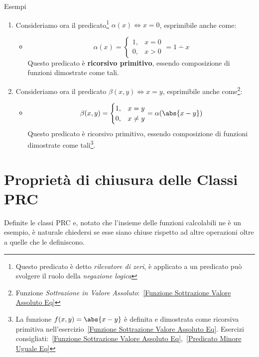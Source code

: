 \begin{generalbox}[colframe=azure-gradient-3!90!black]{Esempi}
\begin{enumerate}
\begin{itemize}
    \end{itemize}
    \item Consideriamo ora il predicato\footnote{Questo predicato è detto \textit{rilevatore di zeri}, è applicato a un predicato può svolgere il ruolo della \textit{negazione logica}} \(\alpha(x)\iff x=0\), esprimibile anche come:
    \begin{itemize}
     \item []
     \begin{equation}
        \alpha(x)=\begin{cases}
                    1, & x=0\\
                    0, & x>0
                  \end{cases} = 1\dotminus x
      \end{equation}
      Questo predicato è \textbf{ricorsivo primitivo}, essendo composizione di funzioni dimostrate come tali.
    \end{itemize}
    \item Consideriamo ora il predicato \(\beta(x,y)\iff x=y\), esprimibile anche come\footnote{Funzione \textit{Sottrazione in Valore Assoluto}:~\ref{Funzione Sottrazione Valore Assoluto Eq}}:
    \begin{itemize}
     \item []
     \begin{equation}
        \beta(x,y)=\begin{cases}
                    1, & x=y\\
                    0, & x\neq y
                  \end{cases} = \alpha(\abs{x-y})
      \end{equation}
      Questo predicato è ricorsivo primitivo, essendo composizione di funzioni dimostrate come tali\footnote{La funzione \(f(x,y)=\abs{x-y}\) è definita e dimostrata come ricorsiva primitiva nell'esercizio~\ref{Funzione Sottrazione Valore Assoluto Eq}. Esercizi consigliati:~\ref{Funzione Sottrazione Valore Assoluto Eq},~\ref{Predicato Minore Uguale Eq}}.
    \end{itemize}
  \end{enumerate}
\end{generalbox}

\newpage
\section{Proprietà di chiusura delle Classi PRC}

Definite le classi PRC e, notato che l'insieme delle funzioni calcolabili ne è un esempio, è naturale chiedersi se esse siano chiuse rispetto ad altre operazioni oltre a quelle che le definiscono.

